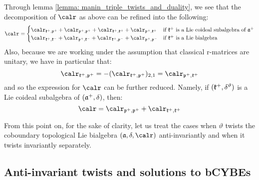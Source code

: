         Through lemma \ref{lemma: manin_triple_twists_and_duality}, we see that the decomposition of $\calr$ as above can be refined into the following:
            \begin{equation}
                \calr =
                \begin{cases}
                    \calr_{\k^+, \p^+} + \calr_{\p^+, \p^+} + \calr_{\k^+, \k^+} + \calr_{\p^+, \k^+} & \text{if $\k^+$ is a Lie coideal subalgebra of $\a^+$}
                    \\
                    \calr_{\k^+, \k^-} + \calr_{\p^+, \k^-} + \calr_{\k^+, \p^-} + \calr_{\p^+, \p^-} & \text{if $\k^+$ is a Lie bialgebra}
                \end{cases}
            \end{equation}
        Also, because we are working under the assumption that classical r-matrices are unitary, we have in particular that:
            $$\calr_{\k^+, \p^+} = -(\calr_{\k^+, \p^+})_{2, 1} = \calr_{\p^+, \k^+}$$
        and so the expression for $\calr$ can be further reduced. Namely, if $(\mathfrak{k}^+, \delta^{\vartheta})$ is a Lie coideal subalgebra of $(\mathfrak{a}^+, \delta)$, then:
            $$\calr = \calr_{\p^+, \p^+} + \calr_{\k^+, \k^+}$$
        \begin{lemma} \label{lemma: symmetric_space_decompositions_of_classical_r_matrices}
            
        \end{lemma}
        
        From this point on, for the sake of clarity, let us treat the cases when $\vartheta$ twists the coboundary topological Lie bialgebra $(\a, \delta, \calr)$ anti-invariantly and when it twists invariantly separately.

    \subsection{Anti-invariant twists and solutions to bCYBEs} \label{subsection: anti_invariantly_twisted_coboundary_topological_lie_bialgebras}

